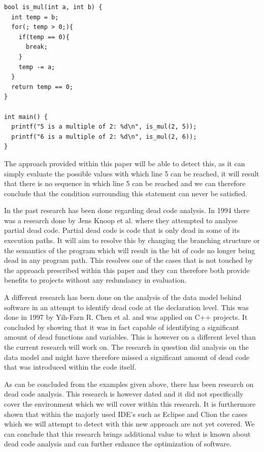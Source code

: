\documentclass[12pt]{thesis}
\begin{document}
\begin{lstlisting}[style=CStyle, caption={Example C code where Eclipse and Clion would not identify dead code.}]
bool is_mul(int a, int b) {
  int temp = b;
  for(; temp > 0;){
    if(temp == 0){
      break;
    }
    temp -= a;
  }
  return temp == 0;
}

int main() {
  printf("5 is a multiple of 2: %d\n", is_mul(2, 5));
  printf("6 is a multiple of 2: %d\n", is_mul(2, 6));
}
\end{lstlisting}

The approach provided within this paper will be able to detect this, as it can simply evaluate the possible values with which line 5 can be reached, it will result that there is no sequence in which line 5 can be reached and we can therefore conclude that the condition surrounding this statement can never be satisfied.

In the past research has been done regarding dead code analysis. In 1994 there was a research done by Jens Knoop et al. \cite{10.1145/773473.178256} where they attempted to analyse partial dead code. Partial dead code is code that is only dead in some of its execution paths. It will aim to resolve this by changing the branching structure or the semantics of the program which will result in the bit of code no longer being dead in any program path. This resolves one of the cases that is not touched by the approach prescribed within this paper and they can therefore both provide benefits to projects without any redundancy in evaluation.

A different research has been done on the analysis of the data model behind software in an attempt to identify dead code at the declaration level. This was done in 1997 by Yih-Farn R. Chen et al. \cite{10.1145/267896.267924} and was applied on C++ projects. It concluded by showing that it was in fact capable of identifying a significant amount of dead functions and variables. This is however on a different level than the current research will work on. The research in question did analysis on the data model and might have therefore missed a significant amount of dead code that was introduced within the code itself.

As can be concluded from the examples given above, there has been research on dead code analysis. This research is however dated and it did not specifically cover the environment which we will cover within this research. It is furthermore shown that within the majorly used IDE's such as Eclipse and Clion the cases which we will attempt to detect with this new approach are not yet covered. We can conclude that this research brings additional value to what is known about dead code analysis and can further enhance the optimization of software.
\end{document}
